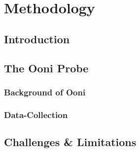 \chapter{Methodology}
\section{Introduction}

\section{The Ooni Probe}
\subsection{Background of Ooni}
\subsection{Data-Collection}

\section{Challenges \& Limitations}
